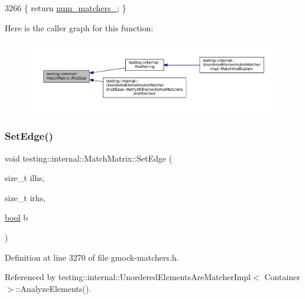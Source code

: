 \begin{DoxyCode}
3266 \{ \textcolor{keywordflow}{return} \hyperlink{classtesting_1_1internal_1_1MatchMatrix_aa89a05c387a88844fd30f03d1a24ce35}{num\_matchers\_}; \}
\end{DoxyCode}
Here is the caller graph for this function\+:
\nopagebreak
\begin{figure}[H]
\begin{center}
\leavevmode
\includegraphics[width=350pt]{classtesting_1_1internal_1_1MatchMatrix_aff068e9fed3a42466c5da8766ac43134_icgraph}
\end{center}
\end{figure}
\mbox{\label{classtesting_1_1internal_1_1MatchMatrix_aac7e9c6e0e4b51e6b1334829a0781021}} 
\subsubsection{\texorpdfstring{Set\+Edge()}{SetEdge()}}
{\footnotesize\ttfamily void testing\+::internal\+::\+Match\+Matrix\+::\+Set\+Edge (\begin{DoxyParamCaption}\item[{size\+\_\+t}]{ilhs,  }\item[{size\+\_\+t}]{irhs,  }\item[{\hyperlink{classbool}{bool}}]{b }\end{DoxyParamCaption})\hspace{0.3cm}{\ttfamily [inline]}}



Definition at line 3270 of file gmock-\/matchers.\+h.



Referenced by testing\+::internal\+::\+Unordered\+Elements\+Are\+Matcher\+Impl$<$ Container $>$\+::\+Analyze\+Elements().


